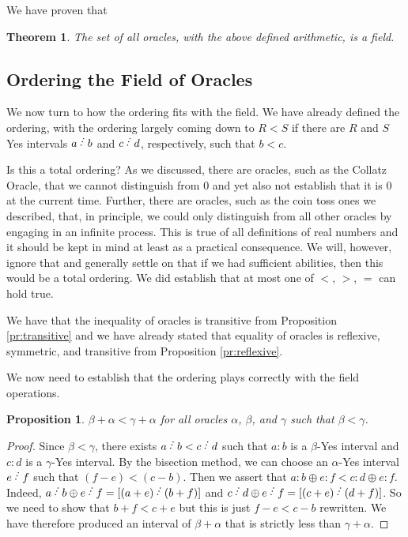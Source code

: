 \documentclass[12pt]{article}
\newtheorem{theorem}{Theorem}[subsection]
\newtheorem{proposition}{Proposition}[subsection]
\begin{document}
We have proven that

\begin{theorem}
The set of all oracles, with the above defined arithmetic, is a field. 
\end{theorem}

\subsection{Ordering the Field of Oracles}

We now turn to how the ordering fits with the field. We have already defined the ordering, with the ordering largely coming down to $R < S$ if there are $R$ and $S$ Yes intervals $a\lte b$ and $c\lte d$, respectively, such that $b<c$. 

Is this a total ordering? As we discussed, there are oracles, such as the Collatz Oracle, that we cannot distinguish from 0 and yet also not establish that it is 0 at the current time. Further, there are oracles, such as the coin toss ones we described, that, in principle, we could only distinguish from all other oracles by engaging in an infinite process. This is true of all definitions of real numbers and it should be kept in mind at least as a practical consequence. We will, however, ignore that and generally settle on that if we had sufficient abilities, then this would be a total ordering. We did establish that at most one of $<$, $>$, $=$ can hold true. 

We have that the inequality of oracles is transitive from Proposition \ref{pr:transitive} and we have already stated that equality of oracles is reflexive, symmetric, and transitive from Proposition \ref{pr:reflexive}. 

We now need to establish that the ordering plays correctly with the field operations. 

\begin{proposition}\label{pr:addinq}
 $\beta + \alpha< \gamma + \alpha$ for all oracles $\alpha$, $\beta$, and $\gamma$ such that $\beta < \gamma$.
\end{proposition}

\begin{proof}
Since $\beta < \gamma$, there exists $a\lte b< c\lte d$ such that $a:b$ is a $\beta$-Yes interval and $c:d$ is a $\gamma$-Yes interval. By the bisection method, we can choose an $\alpha$-Yes interval $e\lte f$ such that $ (f-e) <  (c-b)$. Then we assert that $a:b \oplus e:f  < c:d \oplus e:f$. Indeed, $a \lte b \oplus e \lte f = [(a+e) \lte (b+f)]$ and $c \lte d \oplus e \lte f = [(c+e)\lte (d+f)]$. So we need to show that $b+f < c+e$ but this is just $f-e < c-b$ rewritten. We have therefore produced an interval of $\beta+\alpha$ that is strictly less than $\gamma+\alpha$. 
\end{proof}
\end{document}
